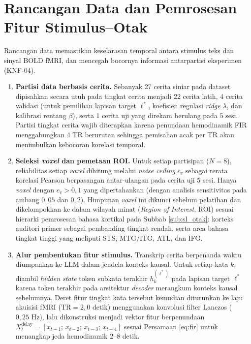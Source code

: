 \section{Rancangan Data dan Pemrosesan Fitur Stimulus--Otak}
\label{sec:ds_data}

Rancangan data memastikan keselarasan temporal antara stimulus teks dan sinyal BOLD fMRI, dan mencegah bocornya informasi antarpartisi eksperimen (KNF-04).

\begin{enumerate}
  \item \textbf{Partisi data berbasis cerita.} Sebanyak 27 cerita siniar pada dataset \textcite{lebel2023natural} dipisahkan secara utuh pada tingkat cerita menjadi 22 cerita latih, 4 cerita validasi (untuk pemilihan lapisan target $\ell^*$, koefisien regulasi \textit{ridge} $\lambda$, dan kalibrasi rentang $\beta$), serta 1 cerita uji yang direkam berulang pada 5 sesi. Partisi tingkat cerita wajib diterapkan karena penundaan hemodinamik FIR menggabungkan 4 TR berurutan sehingga pemisahan acak per TR akan menimbulkan kebocoran korelasi temporal.
  \item \textbf{Seleksi \textit{voxel} dan pemetaan ROI.} Untuk setiap partisipan ($N=8$), reliabilitas setiap \textit{voxel} dihitung melalui \textit{noise ceiling} $c_v$ sebagai rerata korelasi Pearson berpasangan antar-ulangan pada cerita uji 5 sesi. Hanya \textit{voxel} dengan $c_v > 0{,}1$ yang dipertahankan (dengan analisis sensitivitas pada ambang $0{,}05$ dan $0{,}2$). Himpunan \textit{voxel} ini dikunci sebelum pelatihan dan dikelompokkan ke dalam wilayah minat (\textit{Region of Interest}, ROI) sesuai hierarki pemrosesan bahasa kortikal pada Subbab \ref{sub:sl_otak}: korteks auditori primer sebagai pembanding tingkat rendah, serta area bahasa tingkat tinggi yang meliputi STS, MTG/ITG, ATL, dan IFG.
  \item \textbf{Alur pembentukan fitur stimulus.} Transkrip cerita berpenanda waktu diumpankan ke LLM dalam jendela konteks kausal. Untuk setiap kata $k$, diambil \textit{hidden state} token subkata terakhir $h_k^{(\ell^*)}$ pada lapisan target $\ell^*$ karena token terakhir pada arsitektur \textit{decoder} merangkum konteks kausal sebelumnya. Deret fitur tingkat kata tersebut kemudian diturunkan ke laju akuisisi fMRI ($\text{TR} = 2{,}0\text{ detik}$) menggunakan konvolusi filter Lanczos ($0{,}25\text{ Hz}$), lalu dikonstruksi menjadi vektor fitur berpenundaan $X_t^{\text{delay}} = [x_{t-1};\, x_{t-2};\, x_{t-3};\, x_{t-4}]$ sesuai Persamaan \ref{eq:fir} untuk menangkap jeda hemodinamik 2--8 detik.
\end{enumerate}

